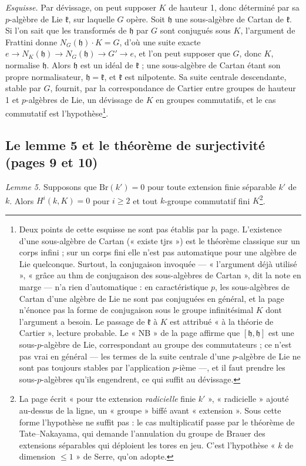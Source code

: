 \documentclass[11pt,a4paper]{article}
\begin{document}
\emph{Esquisse.} Par dévissage, on peut supposer $K$ de hauteur 1, donc
déterminé par sa $p$-algèbre de Lie $\mathfrak{k}$, sur laquelle $G$ opère.
Soit $\mathfrak{h}$ une sous-algèbre de Cartan de $\mathfrak{k}$. Si l'on sait
que les transformés de $\mathfrak{h}$ par $G$ sont conjugués sous $K$, l'argument
de Frattini donne $N_G(\mathfrak{h}) \cdot K = G$, d'où une suite exacte
$e \to N_K(\mathfrak{h}) \to N_G(\mathfrak{h}) \to G' \to e$, et l'on peut supposer
que $G$, donc $K$, normalise $\mathfrak{h}$. Alors $\mathfrak{h}$ est un idéal de
$\mathfrak{k}$ ; une sous-algèbre de Cartan étant son propre normalisateur,
$\mathfrak{h} = \mathfrak{k}$, et $\mathfrak{k}$ est nilpotente. Sa suite centrale
descendante, stable par $G$, fournit, par la correspondance de Cartier entre
groupes de hauteur 1 et $p$-algèbres de Lie, un dévissage de $K$ en groupes
commutatifs, et le cas commutatif est l'hypothèse\footnote{Deux points de cette
esquisse ne sont pas établis par la page. L'existence d'une sous-algèbre de
Cartan (« existe tjrs ») est le théorème classique sur un corps infini ;
sur un corps fini elle n'est pas automatique pour une algèbre de Lie
quelconque. Surtout, la conjugaison invoquée — « l'argument déjà utilisé »,
« grâce au thm de conjugaison des sous-algèbres de Cartan », dit la note en
marge — n'a rien d'automatique : en caractéristique $p$, les sous-algèbres
de Cartan d'une algèbre de Lie ne sont pas conjuguées en général, et la page
n'énonce pas la forme de conjugaison sous le groupe infinitésimal $K$ dont
l'argument a besoin. Le passage de $\mathfrak{k}$ à $K$ est attribué « à la
théorie de Cartier », lecture probable. Le « NB » de la page affirme que
$[\mathfrak{h},\mathfrak{h}]$ est une sous-$p$-algèbre de Lie, correspondant au
groupe des commutateurs ; ce n'est pas vrai en général — les termes de la
suite centrale d'une $p$-algèbre de Lie ne sont pas toujours stables par
l'application $p$-ième —, et il faut prendre les sous-$p$-algèbres qu'ils
engendrent, ce qui suffit au dévissage.}.

\subsection*{Le lemme 5 et le théorème de surjectivité (pages 9 et 10)}

\emph{Lemme 5.} Supposons que $\mathrm{Br}(k') = 0$ pour toute extension finie
séparable $k'$ de $k$. Alors $H^i(k,K) = 0$ pour $i \geq 2$ et tout $k$-groupe
commutatif fini $K$\footnote{La page écrit « pour tte extension
\emph{radicielle} finie $k'$ », « radicielle » ajouté au-dessus de la ligne, un
« groupe » biffé avant « extension ». Sous cette forme l'hypothèse ne suffit pas : le cas
multiplicatif passe par le théorème de Tate--Nakayama, qui demande l'annulation
du groupe de Brauer des extensions séparables qui déploient les tores en jeu.
C'est l'hypothèse « $k$ de dimension $\leq 1$ » de Serre, qu'on adopte.}.
\end{document}
